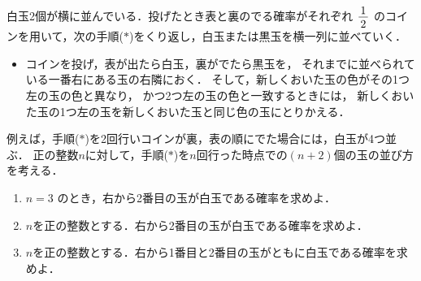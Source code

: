 ﻿\documentclass[../../../uem_tok_q.tex]{subfiles}
\begin{document}
    白玉2個が横に並んでいる．投げたとき表と裏のでる確率がそれぞれ $\myfraca{1}{2}$ %
    のコインを用いて，次の手順($\ast$)をくり返し，白玉または黒玉を横一列に並べていく．

    \begin{itemize}[label={手順($\ast$)}, leftmargin=5\zw, labelsep=.7\zw, topsep=4pt]
        \item コインを投げ，表が出たら白玉，裏がでたら黒玉を，%
            それまでに並べられている一番右にある玉の右隣におく．%
            そして，新しくおいた玉の色がその1つ左の玉の色と異なり，%
            かつ2つ左の玉の色と一致するときには，%
            新しくおいた玉の1つ左の玉を新しくおいた玉と同じ色の玉にとりかえる．
    \end{itemize}
    例えば，手順($\ast$)を2回行いコインが裏，表の順にでた場合には，白玉が4つ並ぶ．%
    正の整数$n$に対して，手順($\ast$)を$n$回行った時点での$(n+2)$個の玉の並び方を考える．

    \begin{enumerate}
        \item $n=3$ のとき，右から2番目の玉が白玉である確率を求めよ．
        \item $n$を正の整数とする．右から2番目の玉が白玉である確率を求めよ．
        \item $n$を正の整数とする．右から1番目と2番目の玉がともに白玉である確率を求めよ．
    \end{enumerate}
\end{document}

